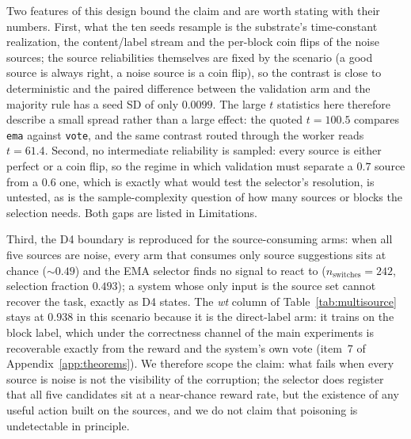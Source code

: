 \documentclass[preprint,12pt]{elsarticle}
\begin{document}
Two features of this design bound the claim and are worth
stating with their numbers. First, what the ten seeds resample is the
substrate's time-constant realization, the content/label stream and the
per-block coin flips of the noise sources; the source reliabilities themselves
are fixed by the scenario (a good source is always right, a noise source is a
coin flip), so the contrast is close to deterministic and the paired
difference between the validation arm and the majority rule has a seed SD of
only $0.0099$. The large $t$ statistics here therefore describe a small spread
rather than a large effect: the quoted $t=100.5$ compares \texttt{ema} against
\texttt{vote}, and the same contrast routed through the worker reads $t=61.4$.
Second, no intermediate reliability is sampled: every source is either
perfect or a coin flip, so the regime in which validation must separate a
$0.7$ source from a $0.6$ one, which is exactly what would test the selector's
resolution, is untested, as is the sample-complexity question of how many
sources or blocks the selection needs. Both gaps are listed in Limitations.

Third, the D4 boundary is reproduced for the source-consuming arms: when all
five sources are noise, every arm that consumes only source suggestions sits
at chance ($\sim0.49$) and the EMA selector finds no signal to react to
($n_{\mathrm{switches}}=242$, selection fraction $0.493$); a system whose
only input is the source set cannot recover the task, exactly as D4 states.
The \textit{wt} column of Table~\ref{tab:multisource} stays at $0.938$ in
this scenario because it is the direct-label arm: it trains on the block
label, which under the correctness channel of the main experiments is
recoverable exactly from the reward and the system's own vote (item~7 of
Appendix~\ref{app:theorems}). We therefore scope the claim: what fails when
every source is noise is not the visibility of the corruption; the
selector does register that all five candidates sit at a near-chance reward
rate, but the existence of any useful action built on the sources, and we
do not claim that poisoning is undetectable in principle.
\end{document}
